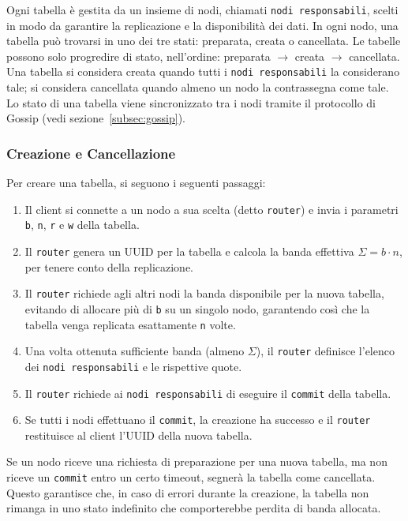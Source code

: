 Ogni tabella è gestita da un insieme di nodi, chiamati \texttt{nodi responsabili}, scelti in modo da garantire la replicazione e la disponibilità dei dati.
In ogni nodo, una tabella può trovarsi in uno dei tre stati: preparata, creata o cancellata.
Le tabelle possono solo progredire di stato, nell'ordine: preparata $\rightarrow$ creata $\rightarrow$ cancellata.
Una tabella si considera creata quando tutti i \texttt{nodi responsabili} la considerano tale; si considera cancellata quando almeno un nodo la contrassegna come tale.
Lo stato di una tabella viene sincronizzato tra i nodi tramite il protocollo di Gossip (vedi sezione~\ref{subsec:gossip}).

\subsubsection{Creazione e Cancellazione}
\label{subsubsec:creazione-cancellazione}

Per creare una tabella, si seguono i seguenti passaggi:
\begin{enumerate}
    \item Il client si connette a un nodo a sua scelta (detto \texttt{router}) e invia i parametri \texttt{b}, \texttt{n}, \texttt{r} e \texttt{w} della tabella.
    \item Il \texttt{router} genera un UUID per la tabella e calcola la banda effettiva $\Sigma = b \cdot n$, per tenere conto della replicazione.
    \item Il \texttt{router} richiede agli altri nodi la banda disponibile per la nuova tabella, evitando di allocare più di \texttt{b} su un singolo nodo, garantendo così che la tabella venga replicata esattamente \texttt{n} volte.
    \item Una volta ottenuta sufficiente banda (almeno $\Sigma$), il \texttt{router} definisce l'elenco dei \texttt{nodi responsabili} e le rispettive quote.
    \item Il \texttt{router} richiede ai \texttt{nodi responsabili} di eseguire il \texttt{commit} della tabella.
    \item Se tutti i nodi effettuano il \texttt{commit}, la creazione ha successo e il \texttt{router} restituisce al client l'UUID della nuova tabella.
\end{enumerate}


Se un nodo riceve una richiesta di preparazione per una nuova tabella, ma non riceve un \texttt{commit} entro un certo timeout, segnerà la tabella come cancellata.
Questo garantisce che, in caso di errori durante la creazione, la tabella non rimanga in uno stato indefinito che comporterebbe perdita di banda allocata.

